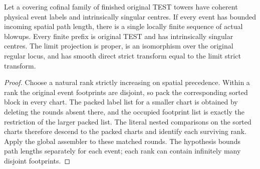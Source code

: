\begin{theorem}
\label{hir:g8-cofinal-weak-rank-intrinsic-endpoint}
\leanok
Let a covering cofinal family of finished original TEST towers
have coherent physical event labels and intrinsically singular
centres. If every event has bounded incoming spatial path length,
there is a single locally finite sequence of actual blowups.
Every finite prefix is original TEST and has intrinsically singular
centres. The limit projection is proper, is an isomorphism over
the original regular locus, and has smooth direct strict transform
equal to the limit strict transform.
\end{theorem}
\begin{proof}
Choose a natural rank strictly increasing on spatial precedence.
Within a rank the original event footprints are disjoint, so pack
the corresponding sorted block in every chart. The packed label
list for a smaller chart is obtained by deleting the rounds absent
there, and the occupied footprint list is exactly the restriction
of the larger packed list. The literal nested comparisons on the
sorted charts therefore descend to the packed charts and identify
each surviving rank. Apply the global assembler to these matched
rounds. The hypothesis bounds path lengths separately for each
event; each rank can contain infinitely many disjoint footprints.
\end{proof}

